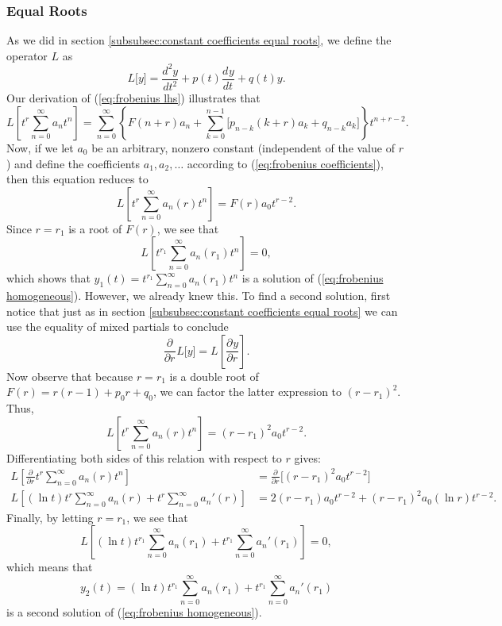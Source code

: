 \documentclass{myart}
\newcommand{\eq}[1]{(\ref{eq:#1})}
\newcommand{\deriv}[3][]{\frac{d^{#1}#2}{d#3^{#1}}}
\newcommand{\pderiv}[3][]{\frac{\partial^{#1}#2}{\partial#3^{#1}}}
\begin{document}
\subsubsection{Equal Roots} \label{subsubsec:frobenius equal roots}

As we did in section \ref{subsubsec:constant coefficients equal roots}, we define the operator $L$ as
\begin{equation*}
L\big[y\big] = \deriv[2]{y}{t} + p(t) \deriv{y}{t} + q(t) y.
\end{equation*}
Our derivation of \eq{frobenius lhs} illustrates that
\begin{equation*}
L\left[t^r \sum_{n=0}^\infty a_n t^n\right] = \sum_{n=0}^\infty \left\{F(n + r) a_n + \sum_{k=0}^{n-1} \Big[p_{n-k} (k+r) a_k + q_{n-k} a_k\Big]\right\} t^{n+r-2}.
\end{equation*}
Now, if we let $a_0$ be an arbitrary, nonzero constant (independent of the value of $r$) and define the coefficients $a_1, a_2, \ldots$ according to \eq{frobenius coefficients}, then this equation reduces to
\begin{equation*}
L\left[t^r \sum_{n=0}^\infty a_n(r) t^n\right] = F(r) a_0 t^{r-2}.
\end{equation*}
Since $r = r_1$ is a root of $F(r)$, we see that
\begin{equation*}
L\left[t^{r_1} \sum_{n=0}^\infty a_n(r_1) t^n\right] = 0,
\end{equation*}
which shows that $y_1(t) = t^{r_1} \sum_{n=0}^\infty a_n(r_1) t^n$ is a solution of \eq{frobenius homogeneous}. However, we already knew this. To find a second solution, first notice that just as in section \ref{subsubsec:constant coefficients equal roots} we can use the equality of mixed partials to conclude
\begin{equation*}
\pderiv{}{r} L\big[y\big] = L\left[\pderiv{y}{r}\right].
\end{equation*}
Now observe that because $r = r_1$ is a double root of $F(r) = r(r - 1) + p_0r + q_0$, we can factor the latter expression to $(r - r_1)^2$. Thus,
\begin{equation*}
L\left[t^r \sum_{n=0}^\infty a_n(r) t^n\right] = (r - r_1)^2 a_0 t^{r-2}.
\end{equation*}
Differentiating both sides of this relation with respect to $r$ gives:
\begin{align*}
L\left[\pderiv{}{r} t^r \sum_{n=0}^\infty a_n(r) t^n\right] &= \pderiv{}{r} \bigg[(r - r_1)^2 a_0 t^{r-2}\bigg] \\
L\left[(\ln t) t^r \sum_{n=0}^\infty a_n(r) + t^r \sum_{n=0}^\infty a_n'(r)\right] &= 2(r - r_1) a_0 t^{r-2} + (r - r_1)^2 a_0 (\ln r) t^{r-2}.
\end{align*}
Finally, by letting $r = r_1$, we see that
\begin{equation*}
L\left[(\ln t) t^{r_1} \sum_{n=0}^\infty a_n(r_1) + t^{r_1} \sum_{n=0}^\infty a_n'(r_1)\right] = 0,
\end{equation*}
which means that
\begin{equation*}
y_2(t) = (\ln t) t^{r_1} \sum_{n=0}^\infty a_n(r_1) + t^{r_1} \sum_{n=0}^\infty a_n'(r_1)
\end{equation*}
is a second solution of \eq{frobenius homogeneous}.
\end{document}
